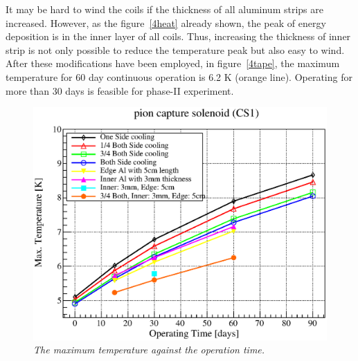 It may be hard to wind the coils if the thickness of all aluminum strips are increased.
However, as the figure~\ref{4heat} already shown, the peak of energy deposition is in the inner layer of all coils.
Thus, increasing the thickness of inner strip is not only possible to reduce the temperature peak but also easy to wind.
After these modifications have been employed, in figure~\ref{4tape}, the maximum temperature for 60 day continuous operation is 6.2 K (orange line).
Operating for more than 30 days is feasible for phase-II experiment.
  \begin{figure}[H]
   \centering
   \includegraphics[scale=0.45]{chapter5/fig/maxtemp.eps}
   \caption{\it The maximum temperature against the operation time.}
   \label{4maxtemp}
  \end{figure}

